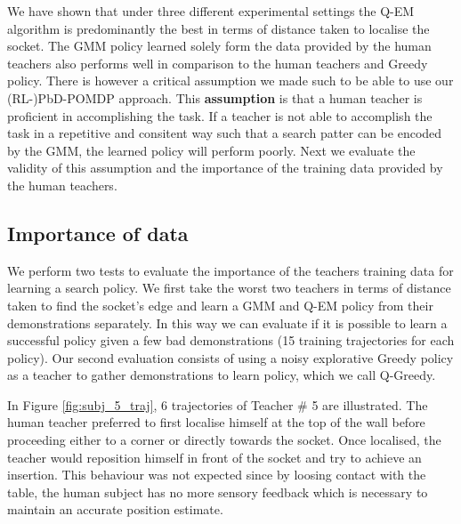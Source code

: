 We have shown that under three different experimental settings the Q-EM algorithm is predominantly the best in terms of distance taken 
to localise the socket. The GMM policy learned solely form the data provided by the human teachers also performs well in comparison to  
the human teachers and Greedy policy. There is however a critical assumption we made such to be able to use our (RL-)PbD-POMDP approach. This \textbf{assumption} 
is that a human teacher is proficient in accomplishing the task. If a teacher is not able to accomplish the task in a repetitive and consitent way such that 
a search patter can be encoded by the GMM, the learned policy will perform poorly. Next we evaluate the validity of 
this assumption and the importance of the training data provided by the human teachers.
% 
\subsection{Importance of data}

We perform two tests to evaluate the importance of the teachers training data for learning a search policy. We first take the 
worst two teachers in terms of distance taken to find the socket's edge and learn a GMM and Q-EM policy from their 
demonstrations separately. In this way we can evaluate if it is possible to learn a successful policy given 
a few bad demonstrations (15 training trajectories for each policy). Our second evaluation consists of using a noisy 
explorative Greedy policy as a teacher to gather demonstrations to learn policy, which we call Q-Greedy. 

In Figure \ref{fig:subj_5_traj}, 6 trajectories of Teacher \# 5 are illustrated. The human teacher preferred to first 
localise himself at the top of the wall before proceeding either to a corner or directly towards the socket. Once localised, the teacher 
would reposition himself in front of the socket and try to achieve an insertion. This behaviour was not expected 
since by loosing contact with the table, the human subject has no more sensory feedback which is necessary 
to maintain an accurate position estimate.

